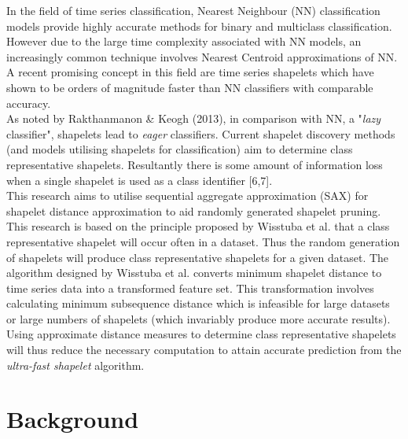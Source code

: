 \documentclass[10pt,a4paper]{article}
\begin{document}
In the field of time series classification, Nearest Neighbour (NN)
classification models provide highly accurate methods for binary and multiclass classification.
However due to the large time complexity associated with NN models, an increasingly common technique involves Nearest Centroid approximations of NN.
A recent promising concept in this field are time series shapelets which have shown to be orders of magnitude faster than NN classifiers with comparable accuracy.
\\
As noted by Rakthanmanon \& Keogh (2013), in comparison with NN, a "\textit{lazy} classifier", shapelets lead to \textit{eager} classifiers. 
Current shapelet discovery methods (and models utilising shapelets for classification) aim to determine class representative shapelets.
Resultantly there is some amount of information loss when a single shapelet is used as a class identifier [6,7].
\\
This research aims to utilise sequential aggregate approximation (SAX) for shapelet distance approximation to aid randomly generated shapelet pruning. 
This research is based on the principle proposed by Wisstuba et al. that a class representative shapelet will occur often in a dataset.
Thus the random generation of shapelets will produce class representative shapelets for a given dataset.
The algorithm designed by Wisstuba et al. converts minimum shapelet distance to time series data into a transformed feature set. 
This transformation involves calculating minimum subsequence distance which is infeasible for large datasets or large numbers of shapelets (which invariably produce more accurate results).
Using approximate distance measures to determine class representative shapelets will thus reduce the necessary computation to attain accurate prediction from the \textit{ultra-fast shapelet} algorithm.

\section{Background}
\end{document}
